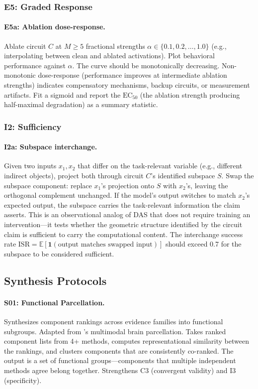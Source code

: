 \documentclass{article}
\begin{document}
\subsubsection{E5: Graded Response}

\paragraph{E5a: Ablation dose-response.} Ablate circuit $C$ at $M \geq 5$ fractional strengths $\alpha \in \{0.1, 0.2, \ldots, 1.0\}$ (e.g., interpolating between clean and ablated activations). Plot behavioral performance against $\alpha$. The curve should be monotonically decreasing. Non-monotonic dose-response (performance improves at intermediate ablation strengths) indicates compensatory mechanisms, backup circuits, or measurement artifacts. Fit a sigmoid and report the $\text{EC}_{50}$ (the ablation strength producing half-maximal degradation) as a summary statistic.

\subsubsection{I2: Sufficiency}

\paragraph{I2a: Subspace interchange.} Given two inputs $x_1, x_2$ that differ on the task-relevant variable (e.g., different indirect objects), project both through circuit $C$'s identified subspace $S$. Swap the subspace component: replace $x_1$'s projection onto $S$ with $x_2$'s, leaving the orthogonal complement unchanged. If the model's output switches to match $x_2$'s expected output, the subspace carries the task-relevant information the claim asserts. This is an observational analog of DAS that does not require training an intervention---it tests whether the geometric structure identified by the circuit claim is sufficient to carry the computational content. The interchange success rate $\text{ISR} = \mathbb{E}[\mathbf{1}(\text{output matches swapped input})]$ should exceed 0.7 for the subspace to be considered sufficient.

\subsection{Synthesis Protocols}
\label{appendix:synthesis}

\paragraph{S01: Functional Parcellation.} Synthesizes component rankings across evidence families into functional subgroups. Adapted from \citet{glasser2016multi}'s multimodal brain parcellation. Takes ranked component lists from 4+ methods, computes representational similarity between the rankings, and clusters components that are consistently co-ranked. The output is a set of functional groups---components that multiple independent methods agree belong together. Strengthens C3 (convergent validity) and I3 (specificity).
\end{document}
